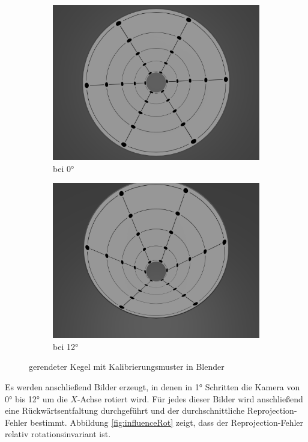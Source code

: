 \begin{figure}[!htb]
	\centering
	\begin{subfigure}{.5\textwidth}
		\centering
		\includegraphics[width=.9\textwidth]{images/blender0.png}
		\caption{bei 0°}
	\end{subfigure}%
	\begin{subfigure}{.5\textwidth}
		\centering
		\includegraphics[width=.9\textwidth]{images/blender12.png}
		\caption{bei 12°}
	\end{subfigure}
	\label{fig:blender}
	\caption{gerendeter Kegel mit Kalibrierungsmuster in Blender}
\end{figure}


Es werden anschließend Bilder erzeugt, in denen in 1° Schritten die Kamera von 0° bis 12° um die $X$-Achse rotiert wird. Für jedes dieser Bilder wird anschließend eine Rückwärtsentfaltung durchgeführt und der durchschnittliche Reprojection-Fehler bestimmt. Abbildung \ref{fig:influenceRot} zeigt, dass der Reprojection-Fehler relativ rotationsinvariant ist. 


